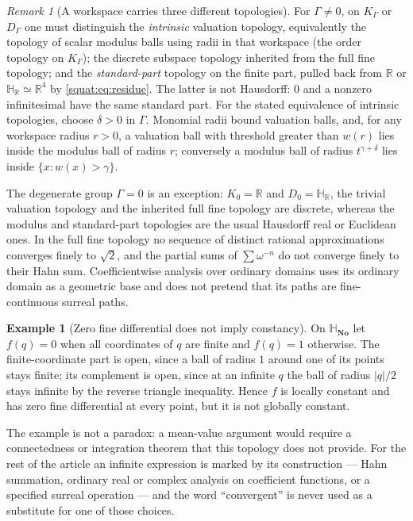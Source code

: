 \documentclass[11pt,letterpaper]{article}
\numberwithin{equation}{section}
\theoremstyle{definition}
\newtheorem{example}[example]{Example}
\theoremstyle{remark}
\newtheorem{remark}[remark]{Remark}
\newcommand{\No}{\mathbf{No}}
\newcommand{\SQ}{\mathbb H_{\No}}
\newcommand{\HR}{\mathbb H_{\mathbb R}}
\newcommand{\R}{\mathbb R}
\newcommand{\abs}[1]{\left|#1\right|}
\begin{document}
\begin{remark}[A workspace carries three different topologies]\label{squat:rem:threetopologies}
For $\Gamma\ne0$, on $K_\Gamma$ or $D_\Gamma$ one must distinguish the
\emph{intrinsic} valuation topology, equivalently the topology of scalar modulus balls
using radii in that workspace (the order topology on $K_\Gamma$); the discrete subspace
topology inherited from the full fine topology; and the \emph{standard-part} topology on
the finite part, pulled back from $\R$ or $\HR\simeq\R^4$ by
\cref{squat:eq:residue}. The latter is not Hausdorff: $0$ and a nonzero infinitesimal
have the same standard part. For the stated equivalence of intrinsic topologies, choose
$\delta>0$ in $\Gamma$. Monomial radii bound valuation balls, and, for any workspace
radius $r>0$, a valuation ball with threshold greater than $w(r)$ lies inside the
modulus ball of radius $r$; conversely a modulus ball of radius $t^{\gamma+\delta}$
lies inside $\{x:w(x)>\gamma\}$.

The degenerate group $\Gamma=0$ is an exception: $K_0=\R$ and $D_0=\HR$, the trivial
valuation topology and the inherited full fine topology are discrete, whereas the
modulus and standard-part topologies are the usual Hausdorff real or Euclidean ones.
In the full fine topology no sequence of distinct
rational approximations converges finely to $\sqrt2$, and the partial sums of
$\sum\omega^{-n}$ do not converge finely to their Hahn sum. Coefficientwise analysis over
ordinary domains uses its ordinary domain as a geometric base and does not pretend that its
paths are fine-continuous surreal paths.
\end{remark}

\begin{example}[Zero fine differential does not imply constancy]\label{squat:ex:zeroderivative}
On $\SQ$ let $f(q)=0$ when all coordinates of $q$ are finite and $f(q)=1$ otherwise. The
finite-coordinate part is open, since a ball of radius $1$ around one of its points stays
finite; its complement is open, since at an infinite $q$ the ball of radius $\abs q/2$
stays infinite by the reverse triangle inequality. Hence $f$ is locally constant and has
zero fine differential at every point, but it is not globally constant.
\end{example}

The example is not a paradox: a mean-value argument would require a connectedness or
integration theorem that this topology does not provide. For the rest of the article an
infinite expression is marked by its construction --- Hahn summation, ordinary real or
complex analysis on coefficient functions, or a specified surreal operation --- and the
word ``convergent'' is never used as a substitute for one of those choices.
\end{document}
